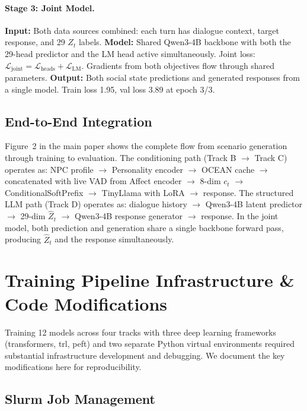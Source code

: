 \documentclass[11pt]{article}
\begin{document}
\paragraph{Stage 3: Joint Model.}
\textbf{Input:} Both data sources combined: each turn has dialogue context, target response, and 29 $Z_t$ labels.
\textbf{Model:} Shared Qwen3-4B backbone with both the 29-head predictor and the LM head active simultaneously.
Joint loss: $\mathcal{L}_\text{joint} = \mathcal{L}_\text{heads} + \mathcal{L}_\text{LM}$.
Gradients from both objectives flow through shared parameters.
\textbf{Output:} Both social state predictions and generated responses from a single model.
Train loss 1.95, val loss 3.89 at epoch 3/3.

\subsection{End-to-End Integration}

Figure~2 in the main paper shows the complete flow from scenario generation through training to evaluation.
The conditioning path (Track B $\rightarrow$ Track C) operates as: NPC profile $\rightarrow$ Personality encoder $\rightarrow$ OCEAN cache $\rightarrow$ concatenated with live VAD from Affect encoder $\rightarrow$ 8-dim $c_t$ $\rightarrow$ ConditionalSoftPrefix $\rightarrow$ TinyLlama with LoRA $\rightarrow$ response.
The structured LLM path (Track D) operates as: dialogue history $\rightarrow$ Qwen3-4B latent predictor $\rightarrow$ 29-dim $\hat{Z}_t$ $\rightarrow$ Qwen3-4B response generator $\rightarrow$ response.
In the joint model, both prediction and generation share a single backbone forward pass, producing $\hat{Z}_t$ and the response simultaneously.

\section{Training Pipeline Infrastructure \& Code Modifications}
\label{app:infrastructure}

Training 12 models across four tracks with three deep learning frameworks (transformers, trl, peft) and two separate Python virtual environments required substantial infrastructure development and debugging.
We document the key modifications here for reproducibility.

\subsection{Slurm Job Management}
\end{document}
